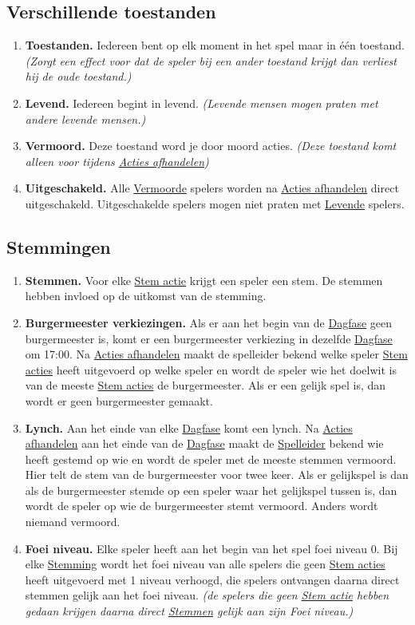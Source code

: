\documentclass{article}
\newenvironment{rulesubsection}[1]{
    \subsection{#1} \label{rule:#1}
    \begin{enumerate}[label=\thesubsection.\arabic{enumi}]
}{
    \end{enumerate}
}
\newcommand{\ruleitem}[1]{\item \label{rule:#1} \textbf{#1.}}
\newcommand{\ruleref}[1]{\hyperref[rule:#1]{#1}}
\begin{document}
\begin{rulesubsection}{Verschillende toestanden}
    \ruleitem{Toestanden} Iedereen bent op elk moment in het spel maar in één toestand. 
    \textit{(Zorgt een effect voor dat de speler bij een ander toestand krijgt dan verliest hij de oude toestand.)}
    \ruleitem{Levend} Iedereen begint in levend. \textit{(Levende mensen mogen praten met andere levende mensen.)}
    \ruleitem{Vermoord} Deze toestand word je door moord acties. \textit{(Deze toestand komt alleen voor tijdens \ruleref{Acties afhandelen})}
    \ruleitem{Uitgeschakeld} Alle \hyperref[rule:Vermoord]{Vermoorde} spelers worden na \ruleref{Acties afhandelen} direct uitgeschakeld.
    Uitgeschakelde spelers mogen niet praten met \hyperref[rule:Levend]{Levende} spelers.
\end{rulesubsection}

\begin{rulesubsection}{Stemmingen}
    \ruleitem{Stemmen} Voor elke \hyperref[rule:Stem acties]{Stem actie} krijgt een speler een stem. De stemmen hebben invloed op de uitkomst van de stemming.
    \ruleitem{Burgermeester verkiezingen} Als er aan het begin van de \ruleref{Dagfase} geen burgermeester is, komt er een burgermeester verkiezing in dezelfde \ruleref{Dagfase}
    om 17:00. Na \ruleref{Acties afhandelen} maakt de spelleider bekend welke speler \ruleref{Stem acties} heeft uitgevoerd op welke speler en wordt de speler wie het doelwit 
    is van de meeste \ruleref{Stem acties} de burgermeester.
    Als er een gelijk spel is, dan wordt er geen burgermeester gemaakt.

    \ruleitem{Lynch} Aan het einde van elke \ruleref{Dagfase} komt een lynch. Na \ruleref{Acties afhandelen} aan het einde van de \ruleref{Dagfase} maakt de \ruleref{Spelleider} bekend
    wie heeft gestemd op wie en wordt de speler met de meeste stemmen vermoord. Hier telt de stem van de burgermeester voor twee keer. Als er gelijkspel is dan als de burgermeester stemde
    op een speler waar het gelijkspel tussen is, dan wordt de speler op wie de burgermeester stemt vermoord. Anders wordt niemand vermoord.
    \ruleitem{Foei niveau} Elke speler heeft aan het begin van het spel foei niveau 0. Bij elke \hyperref[rule:Stemmingen]{Stemming} wordt het foei niveau van alle spelers die geen \ruleref{Stem acties} heeft uitgevoerd
    met 1 niveau verhoogd, die spelers ontvangen daarna direct stemmen gelijk aan het foei niveau. \textit{(de spelers die geen \hyperref[rule:Stem acties]{Stem actie} hebben gedaan krijgen daarna direct \ruleref{Stemmen} gelijk aan zijn Foei niveau.)}
\end{rulesubsection}
\end{document}
